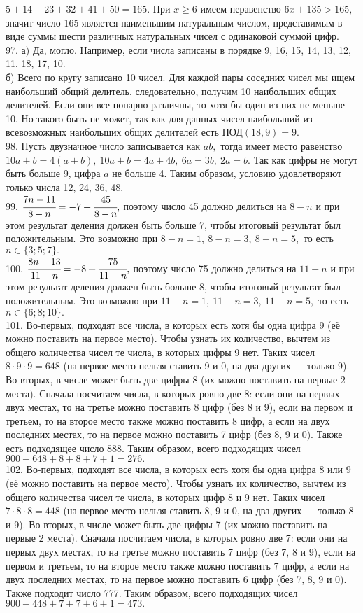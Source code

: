 $5+14+23+32+41+50=165.$ При $x\geqslant6$ имеем неравенство $6x+135>165,$ значит число 165 является наименьшим натуральным числом, представимым в виде суммы шести различных натуральных чисел с одинаковой суммой цифр.\\
97. а) Да, могло. Например, если числа записаны в порядке 9, 16, 15, 14, 13, 12, 11, 18, 17, 10.\\
б) Всего по кругу записано 10 чисел. Для каждой пары соседних чисел мы ищем наибольший общий делитель, следовательно, получим 10 наибольших общих делителей. Если они все попарно различны, то хотя бы один из них не меньше 10. Но такого быть не может, так как для данных чисел наибольший из всевозможных наибольших общих делителей есть НОД$(18,9) = 9.$\\
98. Пусть двузначное число записывается как $\overline{ab},$ тогда имеет место равенство $10a+b=4(a+b),\ 10a+b=4a+4b,\ 6a=3b,\ 2a=b.$ Так как цифры не могут быть больше 9, цифра $a$ не больше 4. Таким образом, условию удовлетворяют только числа 12, 24, 36, 48.\\
99. $\cfrac{7n-11}{8-n}=-7+\cfrac{45}{8-n},$ поэтому число 45 должно делиться на $8-n$ и при этом результат деления должен быть больше 7, чтобы итоговый результат был положительным. Это возможно при $8-n=1,\ 8-n=3,\ 8-n=5,$ то есть $n\in\{3;5;7\}.$\\
100. $\cfrac{8n-13}{11-n}=-8+\cfrac{75}{11-n},$ поэтому число 75 должно делиться на $11-n$ и при этом результат деления должен быть больше 8, чтобы итоговый результат был положительным. Это возможно при $11-n=1,\ 11-n=3,\ 11-n=5,$ то есть $n\in\{6;8;10\}.$\\
101. Во-первых, подходят все числа, в которых есть хотя бы одна цифра 9 (её можно поставить на первое место). Чтобы узнать их количество, вычтем из общего количества чисел те числа, в которых цифры 9 нет. Таких чисел $8\cdot9\cdot9=648$ (на первое место нельзя ставить 9 и 0, на два других --- только 9). Во-вторых, в числе может быть две цифры 8 (их можно поставить на первые 2 места). Сначала посчитаем числа, в которых ровно две 8: если они на первых двух местах, то на третье можно поставить 8 цифр (без 8 и 9), если на первом и третьем, то на второе место также можно поставить 8 цифр, а если на двух последних местах, то на первое можно поставить 7 цифр (без 8, 9 и 0). Также есть подходящее число 888.
Таким образом, всего подходящих чисел $900-648+8+8+7+1=276.$\\
102. Во-первых, подходят все числа, в которых есть хотя бы одна цифра 8 или 9 (её можно поставить на первое место). Чтобы узнать их количество, вычтем из общего количества чисел те числа, в которых цифр 8 и 9 нет. Таких чисел $7\cdot8\cdot8=448$ (на первое место нельзя ставить 8, 9 и 0, на два других --- только 8 и 9). Во-вторых, в числе может быть две цифры 7 (их можно поставить на первые 2 места). Сначала посчитаем числа, в которых ровно две 7: если они на первых двух местах, то на третье можно поставить 7 цифр (без 7, 8 и 9), если на первом и третьем, то на второе место также можно поставить 7 цифр, а если на двух последних местах, то на первое можно поставить 6 цифр (без 7, 8, 9 и 0). Также подходит число 777.
Таким образом, всего подходящих чисел $900-448+7+7+6+1=473.$
\newpage
